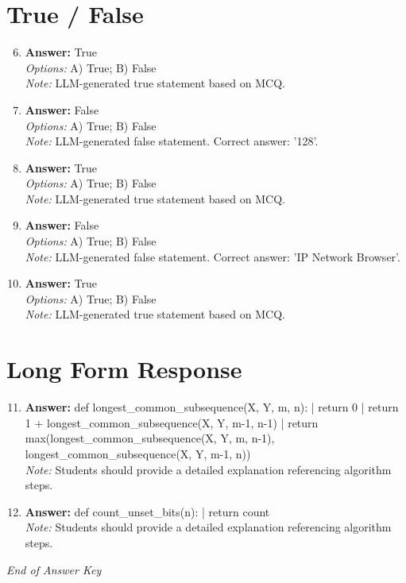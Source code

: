 \documentclass[12pt]{article}
\begin{document}
\section*{True / False}
\begin{enumerate}[label=\arabic*.]
\setcounter{enumi}{5}
\item \textbf{Answer:} True
\\ \textit{Options:} A) True; B) False
\\ \textit{Note:} LLM-generated true statement based on MCQ.
\item \textbf{Answer:} False
\\ \textit{Options:} A) True; B) False
\\ \textit{Note:} LLM-generated false statement. Correct answer: '128'.
\item \textbf{Answer:} True
\\ \textit{Options:} A) True; B) False
\\ \textit{Note:} LLM-generated true statement based on MCQ.
\item \textbf{Answer:} False
\\ \textit{Options:} A) True; B) False
\\ \textit{Note:} LLM-generated false statement. Correct answer: 'IP Network Browser'.
\item \textbf{Answer:} True
\\ \textit{Options:} A) True; B) False
\\ \textit{Note:} LLM-generated true statement based on MCQ.
\end{enumerate}

\section*{Long Form Response}
\begin{enumerate}[label=\arabic*.]
\setcounter{enumi}{10}
\item \textbf{Answer:} def longest\_common\_subsequence(X, Y, m, n): | return 0 | return 1 + longest\_common\_subsequence(X, Y, m-1, n-1) | return max(longest\_common\_subsequence(X, Y, m, n-1), longest\_common\_subsequence(X, Y, m-1, n))
\\ \textit{Note:} Students should provide a detailed explanation referencing algorithm steps.
\item \textbf{Answer:} def count\_unset\_bits(n): | return count
\\ \textit{Note:} Students should provide a detailed explanation referencing algorithm steps.
\end{enumerate}

\vfill
\noindent\textit{End of Answer Key}
\end{document}
